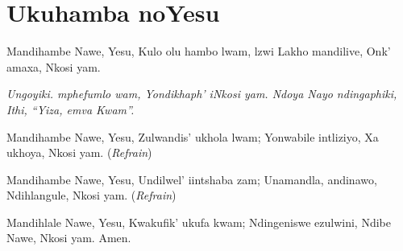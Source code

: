 \starttocol
\chapter{Ukuhamba noYesu}
\nexttocol
\hfill{\it }
\stoptocol
\starttocol
\startlines
{\sc Mandihambe} Nawe, Yesu,
Kulo olu hambo lwam,
lzwi Lakho mandilive,
Onk' amaxa, Nkosi yam.

{\it
Ungoyiki. mphefumlo wam,
Yondikhaph' iNkosi yam.
Ndoya Nayo ndingaphiki,  
Ithi, ``Yiza, emva Kwam''.} 

Mandihambe Nawe, Yesu,
Zulwandis' ukhola lwam; 
Yonwabile intliziyo,
Xa ukhoya, Nkosi yam.
          \hfill({\it Refrain})~~~~~~~~~

Mandihambe Nawe, Yesu,  
Undilwel' iintshaba zam; 
Unamandla, andinawo, 
Ndihlangule, Nkosi yam.
          \hfill({\it Refrain})~~~~~~~~~

Mandihlale Nawe, Yesu, 
Kwakufik' ukufa kwam;
Ndingeniswe ezulwini,
Ndibe Nawe, Nkosi yam. 
          \hfill Amen.~~~~~~~~~

\stoplines
\nexttocol

\stoptocol
